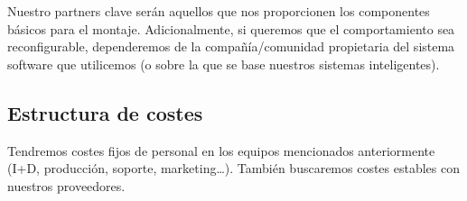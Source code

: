 Nuestro partners clave serán aquellos que nos proporcionen los componentes básicos para el montaje. Adicionalmente, si queremos que el comportamiento sea reconfigurable, dependeremos de la compañía/comunidad propietaria del sistema software que utilicemos (o sobre la que se base nuestros sistemas inteligentes).

\subsection{Estructura de costes}


Tendremos costes fijos de personal en los equipos mencionados anteriormente (I+D, producción, soporte, marketing\dots). También buscaremos costes estables con nuestros proveedores.